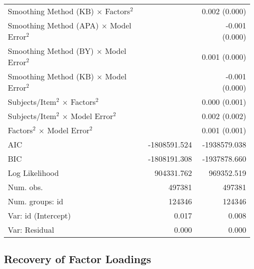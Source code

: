 \documentclass[
  english,
  man]{apa6}
\begin{document}
\begin{center}
\begin{longtable}{l D{)}{)}{11)0} D{)}{)}{11)0}}
Smoothing Method (KB) $\times$ Factors$^2$        &                   & 0.002 \; (0.000)  \\
Smoothing Method (APA) $\times$ Model Error$^2$   &                   & -0.001 \; (0.000) \\
Smoothing Method (BY) $\times$ Model Error$^2$    &                   & 0.001 \; (0.000)  \\
Smoothing Method (KB) $\times$ Model Error$^2$    &                   & -0.001 \; (0.000) \\
Subjects/Item$^2$ $\times$ Factors$^2$            &                   & 0.000 \; (0.001)  \\
Subjects/Item$^2$ $\times$ Model Error$^2$        &                   & 0.002 \; (0.002)  \\
Factors$^2$ $\times$ Model Error$^2$              &                   & 0.001 \; (0.001)  \\
\hline
AIC                                               & -1808591.524      & -1938579.038      \\
BIC                                               & -1808191.308      & -1937878.660      \\
Log Likelihood                                    & 904331.762        & 969352.519        \\
Num. obs.                                         & 497381            & 497381            \\
Num. groups: id                                   & 124346            & 124346            \\
Var: id (Intercept)                               & 0.017             & 0.008             \\
Var: Residual                                     & 0.000             & 0.000             \\
\end{longtable}
\end{center}

\hypertarget{recovery-of-factor-loadings}{%
\subsection{Recovery of Factor Loadings}\label{recovery-of-factor-loadings}}
\end{document}

